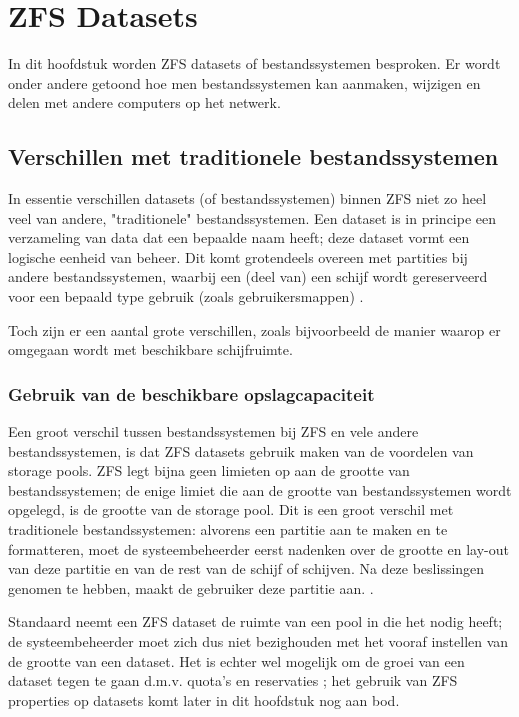 

\chapter{ZFS Datasets}
\label{ch:h7}

In dit hoofdstuk worden ZFS datasets of bestandssystemen besproken. Er wordt onder andere getoond hoe men bestandssystemen kan aanmaken, wijzigen en delen met andere computers op het netwerk. 

\section{Verschillen met traditionele bestandssystemen}

In essentie verschillen datasets (of bestandssystemen) binnen ZFS niet zo heel veel van andere, "traditionele" bestandssystemen. Een dataset is in principe een verzameling van data dat een bepaalde naam heeft; deze dataset vormt een logische eenheid van beheer. Dit komt grotendeels overeen met partities bij andere bestandssystemen, waarbij een (deel van) een schijf wordt gereserveerd voor een bepaald type gebruik (zoals gebruikersmappen) \autocite{Lucas2015}.

Toch zijn er een aantal grote verschillen, zoals bijvoorbeeld de manier waarop er omgegaan wordt met beschikbare schijfruimte.  

\subsection{Gebruik van de beschikbare opslagcapaciteit}

Een groot verschil tussen bestandssystemen bij ZFS en vele andere bestandssystemen, is dat ZFS datasets gebruik maken van de voordelen van storage pools. ZFS legt bijna geen limieten op aan de grootte van bestandssystemen; de enige limiet die aan de grootte van bestandssystemen wordt opgelegd, is de grootte van de storage pool. Dit is een groot verschil met traditionele bestandssystemen: alvorens een partitie aan te maken en te formatteren, moet de systeembeheerder eerst nadenken over de grootte en lay-out van deze partitie en van de rest van de schijf of schijven. Na deze beslissingen genomen te hebben, maakt de gebruiker deze partitie aan. \autocite{Lucas2015}.

Standaard neemt een ZFS dataset de ruimte van een pool in die het nodig heeft; de systeembeheerder moet zich dus niet bezighouden met het vooraf instellen van de grootte van een dataset. Het is echter wel mogelijk om de groei van een dataset tegen te gaan d.m.v. quota's en reservaties \autocite{FBSDDP2017}; het gebruik van ZFS properties op datasets komt later in dit hoofdstuk nog aan bod. 

